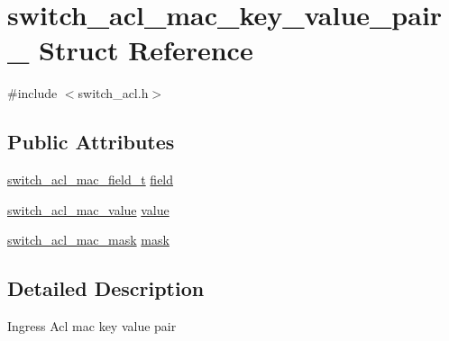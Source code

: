 \hypertarget{structswitch__acl__mac__key__value__pair__}{\section{switch\+\_\+acl\+\_\+mac\+\_\+key\+\_\+value\+\_\+pair\+\_\+ Struct Reference}
\label{structswitch__acl__mac__key__value__pair__}
}


{\ttfamily \#include $<$switch\+\_\+acl.\+h$>$}

\subsection*{Public Attributes}
\begin{DoxyCompactItemize}
\item 
\hyperlink{group__ACL_gabee0fa282b10d53d4536c60d8f71c959}{switch\+\_\+acl\+\_\+mac\+\_\+field\+\_\+t} \hyperlink{structswitch__acl__mac__key__value__pair___a5862e9e68687060562247eb562b0ec40}{field}
\item 
\hyperlink{group__ACL_gaebafd1394ccbcc5e09ad753cd6823e1d}{switch\+\_\+acl\+\_\+mac\+\_\+value} \hyperlink{structswitch__acl__mac__key__value__pair___abebce0f3e7313b252726036acdd46561}{value}
\item 
\hyperlink{group__ACL_ga77cb290b807499a0fe9a32ef3095fee4}{switch\+\_\+acl\+\_\+mac\+\_\+mask} \hyperlink{structswitch__acl__mac__key__value__pair___a3764ff0ea3fdc45e22d435e2797b92ed}{mask}
\end{DoxyCompactItemize}


\subsection{Detailed Description}
Ingress Acl mac key value pair 

